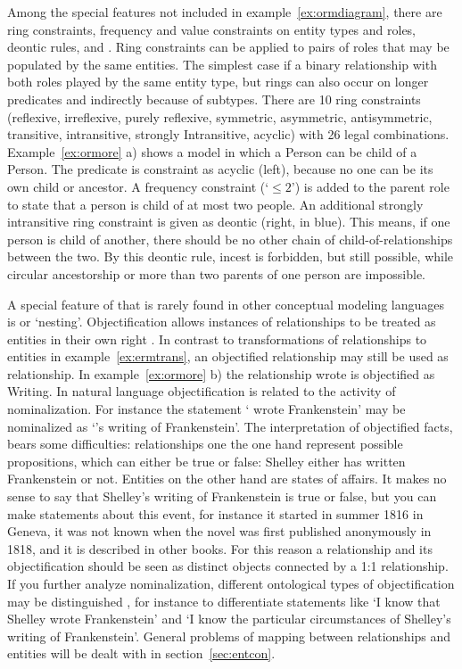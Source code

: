 Among the special  features not included in
example~\ref{ex:ormdiagram}, there are ring constraints, frequency and value
constraints on entity types and roles, deontic rules, and
.  Ring constraints can be applied to pairs of roles that
may be populated by the same entities. The simplest case if a binary
relationship with both roles played by the same entity type, but rings can also
occur on longer predicates and indirectly because of subtypes. There are 10
ring constraints (reflexive, irreflexive, purely reflexive, symmetric,
asymmetric, antisymmetric, transitive, intransitive, strongly Intransitive,
acyclic) with 26 legal combinations. Example~\ref{ex:ormore} {\ormtext a)}
shows a model in which a {\ormtext Person} can be {\ormtext child of} a
{\ormtext Person}.  The predicate is constraint as acyclic (left), because no
one can be its own child or ancestor. A frequency constraint (`$\le 2$') is
added to the {\ormtext parent} role to state that a person is child of at most
two people. An additional strongly intransitive ring constraint is given as
deontic (right, in blue). This means, if one person is child of another, there
should be no other chain of child-of-relationships between the two. By this
deontic rule, incest is forbidden, but still possible, while circular
ancestorship or more than two parents of one person are impossible.

A special feature of  that is rarely found in other conceptual
modeling languages is  or `nesting'. Objectification
allows instances of relationships to be treated as entities in their own right
\cite[ch. 10.5.]{Halpin2008}. In contrast to transformations of relationships
to entities in example~\ref{ex:ermtrans}, an objectified relationship may still
be used as relationship. In example~\ref{ex:ormore} {\ormtext b)} the
relationship {\ormtext wrote} is objectified as {\ormtext Writing}. In natural
language objectification is related to the activity of nominalization. For
instance the statement ` wrote Frankenstein' may be
nominalized as `'s writing of Frankenstein'. The
interpretation of objectified facts, bears some difficulties: relationships one
the one hand represent possible propositions, which can either be true or
false: Shelley either has written Frankenstein or not.  Entities on the other
hand are states of affairs. It makes no sense to say that Shelley's writing of
Frankenstein is true or false, but you can make statements about this event,
for instance it started in summer 1816 in Geneva, it was not known when the
novel was first published anonymously in 1818, and it is described in other
books. For this reason a relationship and its objectification should be seen
as distinct objects connected by a 1:1 relationship. If you further analyze 
nominalization, different ontological types of objectification may be 
distinguished \cite{Moltmann2007}, for instance to differentiate statements
like `I know that Shelley wrote Frankenstein' and `I know the particular 
circumstances of Shelley's writing of Frankenstein'. General problems of
mapping between relationships and entities will be dealt with in 
section~\ref{sec:entcon}. 

